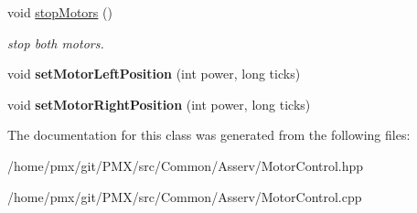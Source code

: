 \begin{DoxyCompactItemize}
\mbox{\label{classMotorControl_aab9b23a2b103b120835294cffb185821}} 
void \hyperlink{classMotorControl_aab9b23a2b103b120835294cffb185821}{stop\+Motors} ()
\begin{DoxyCompactList}\small\item\em stop both motors. \end{DoxyCompactList}\item 
\mbox{\label{classMotorControl_a2bee9b8549bd2cf47da46864219645cf}} 
void {\bfseries set\+Motor\+Left\+Position} (int power, long ticks)
\item 
\mbox{\label{classMotorControl_a0fbfdf705e57833211084236dde3f91c}} 
void {\bfseries set\+Motor\+Right\+Position} (int power, long ticks)
\end{DoxyCompactItemize}


The documentation for this class was generated from the following files\+:\begin{DoxyCompactItemize}
\item 
/home/pmx/git/\+P\+M\+X/src/\+Common/\+Asserv/Motor\+Control.\+hpp\item 
/home/pmx/git/\+P\+M\+X/src/\+Common/\+Asserv/Motor\+Control.\+cpp\end{DoxyCompactItemize}
